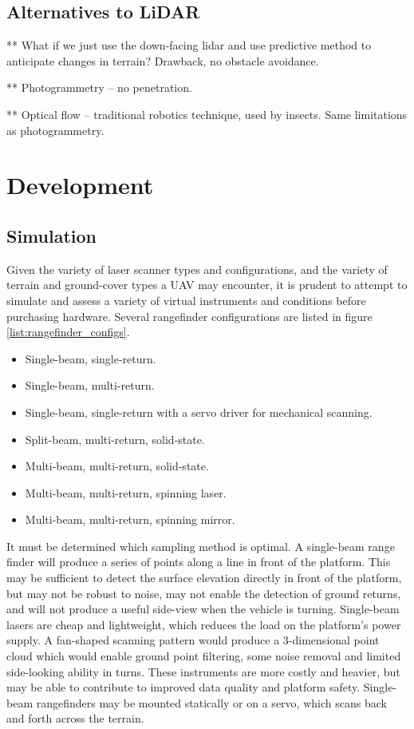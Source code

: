 \documentclass[10pt,a4paper]{report}
\begin{document}
\subsection{Alternatives to LiDAR}

** What if we just use the down-facing lidar and use predictive method to anticipate changes in terrain? Drawback, no obstacle avoidance.

** Photogrammetry -- no penetration.

** Optical flow -- traditional robotics technique, used by insects. Same limitations as photogrammetry.

\section{Development}

\subsection{Simulation}

Given the variety of laser scanner types and configurations, and the variety of terrain and ground-cover types a UAV may encounter, it is prudent to attempt to simulate and assess a variety of virtual instruments and conditions before purchasing hardware. Several rangefinder configurations are listed in figure \ref{list:rangefinder_configs}.

\begin{itemize}
\item Single-beam, single-return.
\item Single-beam, multi-return.
\item Single-beam, single-return with a servo driver for mechanical scanning.
\item Split-beam, multi-return, solid-state.
\item Multi-beam, multi-return, solid-state.
\item Multi-beam, multi-return, spinning laser.
\item Multi-beam, multi-return, spinning mirror.
\label{list:rangefinder_configs}
\end{itemize}

It must be determined which sampling method is optimal. A single-beam range finder will produce a series of points along a line in front of the platform. This may be sufficient to detect the surface elevation directly in front of the platform, but may not be robust to noise, may not enable the detection of ground returns, and will not produce a useful side-view when the vehicle is turning. Single-beam lasers are cheap and lightweight, which reduces the load on the platform's power supply. A fan-shaped scanning pattern would produce a 3-dimensional point cloud which would enable ground point filtering, some noise removal and limited side-looking ability in turns. These instruments are more costly and heavier, but may be able to contribute to improved data quality and platform safety. Single-beam rangefinders may be mounted statically or on a servo, which scans back and forth across the terrain.
\end{document}
